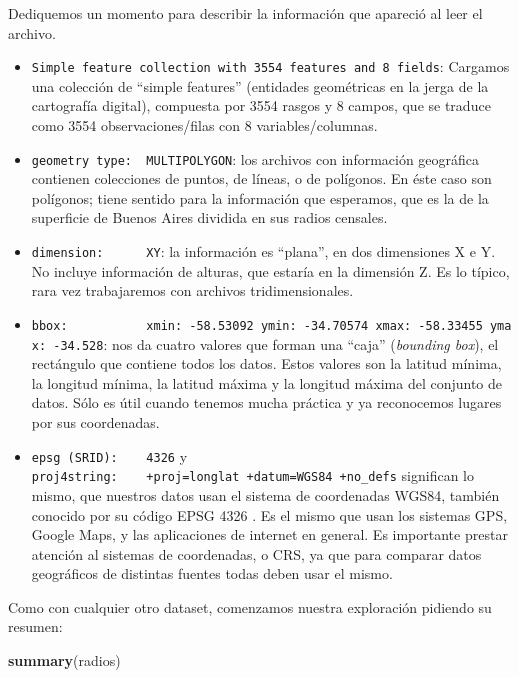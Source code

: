 \documentclass[]{book}
\newenvironment{Shaded}{\begin{snugshade}}{\end{snugshade}}
\newcommand{\KeywordTok}[1]{\textcolor[rgb]{0.13,0.29,0.53}{\textbf{#1}}}
\newcommand{\NormalTok}[1]{#1}
\providecommand{\tightlist}{%
  \setlength{\itemsep}{0pt}\setlength{\parskip}{0pt}}
\begin{document}
Dediquemos un momento para describir la información que apareció al leer
el archivo.

\begin{itemize}
\tightlist
\item
  \texttt{Simple\ feature\ collection\ with\ 3554\ features\ and\ 8\ fields}:
  Cargamos una colección de ``simple features'' (entidades geométricas
  en la jerga de la cartografía digital), compuesta por 3554 rasgos y 8
  campos, que se traduce como 3554 observaciones/filas con 8
  variables/columnas.
\item
  \texttt{geometry\ type:\ \ MULTIPOLYGON}: los archivos con información
  geográfica contienen colecciones de puntos, de líneas, o de polígonos.
  En éste caso son polígonos; tiene sentido para la información que
  esperamos, que es la de la superficie de Buenos Aires dividida en sus
  radios censales.
\item
  \texttt{dimension:\ \ \ \ \ \ XY}: la información es ``plana'', en dos
  dimensiones X e Y. No incluye información de alturas, que estaría en
  la dimensión Z. Es lo típico, rara vez trabajaremos con archivos
  tridimensionales.
\item
  \texttt{bbox:\ \ \ \ \ \ \ \ \ \ \ xmin:\ -58.53092\ ymin:\ -34.70574\ xmax:\ -58.33455\ ymax:\ -34.528}:
  nos da cuatro valores que forman una ``caja'' (\emph{bounding box}),
  el rectángulo que contiene todos los datos. Estos valores son la
  latitud mínima, la longitud mínima, la latitud máxima y la longitud
  máxima del conjunto de datos. Sólo es útil cuando tenemos mucha
  práctica y ya reconocemos lugares por sus coordenadas.
\item
  \texttt{epsg\ (SRID):\ \ \ \ 4326} y
  \texttt{proj4string:\ \ \ \ +proj=longlat\ +datum=WGS84\ +no\_defs}
  significan lo mismo, que nuestros datos usan el sistema de coordenadas
  WGS84, también conocido por su código EPSG 4326 . Es el mismo que usan
  los sistemas GPS, Google Maps, y las aplicaciones de internet en
  general. Es importante prestar atención al sistemas de coordenadas, o
  CRS, ya que para comparar datos geográficos de distintas fuentes todas
  deben usar el mismo.
\end{itemize}

Como con cualquier otro dataset, comenzamos nuestra exploración pidiendo
su resumen:

\begin{Shaded}
\begin{Highlighting}[]
\KeywordTok{summary}\NormalTok{(radios)}
\end{Highlighting}
\end{Shaded}
\end{document}
